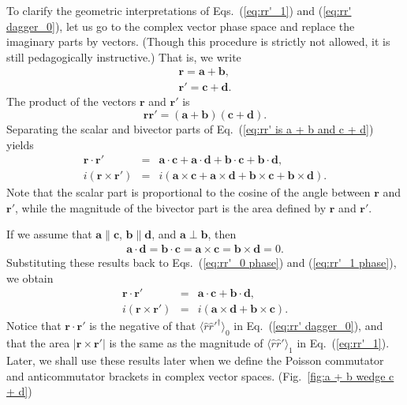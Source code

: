 \documentclass[11pt,twocolumn]{article}
\begin{document}
To clarify the geometric interpretations of Eqs.~(\ref{eq:rr'_1}) and (\ref{eq:rr' dagger_0}), let us go to the complex vector phase space and replace the imaginary parts by vectors. (Though this procedure is strictly not allowed, it is still pedagogically instructive.)  That is, we write
\begin{eqnarray}
\label{eq:r is a + b}
\mathbf r=\mathbf a+\mathbf b,\\
\label{eq:r' is c + d}
\mathbf r'=\mathbf c+\mathbf d.
\end{eqnarray}
The product of the vectors $\mathbf r$ and $\mathbf r'$ is
\begin{equation}
\label{eq:rr' is a + b and c + d}
\mathbf r\mathbf r'=(\mathbf a+\mathbf b)(\mathbf c+\mathbf d).
\end{equation}
Separating the scalar and bivector parts of Eq.~(\ref{eq:rr' is a + b and c + d}) yields
\begin{eqnarray}
\label{eq:rr'_0 phase}
\mathbf r\cdot\mathbf r'&=&\mathbf a\cdot\mathbf c+\mathbf a\cdot\mathbf d+\mathbf b\cdot\mathbf c+\mathbf b\cdot\mathbf d,\\
\label{eq:rr'_1 phase}
i(\mathbf r\times\mathbf r')&=&i(\mathbf a\times\mathbf c+\mathbf a\times\mathbf d+\mathbf b\times\mathbf c+\mathbf b\times\mathbf d).
\end{eqnarray}
Note that the scalar part is proportional to the cosine of the angle between $\mathbf r$ and $\mathbf r'$, while the magnitude of the bivector part is the area defined by $\mathbf r$ and $\mathbf r'$.

If we assume that $\mathbf a\parallel\mathbf c$, $\mathbf b\parallel\mathbf d$, and $\mathbf a\perp\mathbf b$, then
\begin{eqnarray}
\label{eq:a dot d is b dot c is a times c is b times d is 0}
\mathbf a\cdot\mathbf d=\mathbf b\cdot\mathbf c=\mathbf a\times\mathbf c=\mathbf b\times\mathbf d=0.
\end{eqnarray}
Substituting these results back to Eqs.~(\ref{eq:rr'_0 phase}) and (\ref{eq:rr'_1 phase}), we obtain
\begin{eqnarray}
\label{eq:rr'_0 phase is a dot c + b dot d}
\mathbf r\cdot\mathbf r'&=&\mathbf a\cdot\mathbf c+\mathbf b\cdot\mathbf d,\\
\label{eq:rr'_2 phase is i a times d + b times c}
i(\mathbf r\times\mathbf r')&=&i(\mathbf a\times\mathbf d+\mathbf b\times\mathbf c).
\end{eqnarray}
Notice that $\mathbf r\cdot\mathbf r'$ is the negative of that $\langle\hat r\hat r'^\dagger\rangle_0$ in Eq.~(\ref{eq:rr' dagger_0}), and that the area $|\mathbf r\times\mathbf r'|$ is the same as the magnitude of $\langle\hat r\hat r'\rangle_1$ in Eq.~(\ref{eq:rr'_1}).  Later, we shall use these results later when we define the Poisson commutator and anticommutator brackets in complex vector spaces.  (Fig.~\ref{fig:a + b wedge c + d})
\end{document}
